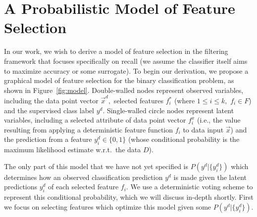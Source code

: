 \section{A Probabilistic Model of Feature Selection}

%


In our work, we wish to derive a model of feature selection in the
filtering framework that focuses specifically on recall (we assume the
classifier itself aims to maximize accuracy or some surrogate).  To
begin our derivation, we propose a graphical model of feature
selection for the binary classification problem, as shown in
Figure~\ref{fig:model}. Double-walled nodes represent observed
variables, including the data point vector $\vec{x}^{d},$ selected
features $f_i^*$ (where $1\leq i\leq k,$ $f_i\in F$) and the
supervised class label $y^d$. Single-walled circle nodes represent
latent variables, including a selected attribute of data
point vector $f_i^x$ (i.e., the value resulting from applying
a deterministic feature function $f_i$ to data input $\vec{x}$) and
the prediction from a feature $y^d_i \in \{0,1\}$ (whose conditional
probability is the maximum likelihood estimate w.r.t.\ the data $D$).

The only part of this model that we have not yet specified is 
$P(y^d|\{y^d_i\})$ which determines how an observed classification 
prediction $y^d$ is made given the latent predictions $y^d_i$ of each 
selected feature $f_i$.  We use a deterministic voting scheme
to represent this conditional probability, which we will discuss
in-depth shortly.  First we focus on selecting features which optimize
this model given some $P(y^d|\{y^d_i\})$.

